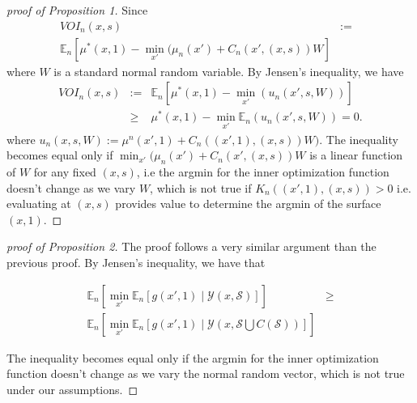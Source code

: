 \documentclass[letterpaper]{article}
\newcommand{\E}{\mathbb{E}}
\numberwithin{equation}{section}
\renewcommand{\S}{\mathcal{S}}
\newcommand{\Y}{\mathcal{Y}}
\begin{document}
\begin{proof}[proof of Proposition 1]
Since
\begin{eqnarray*}
VOI_{n}(x, s) &:=& \\
\E_n[\mu^*(x, 1) - \min_{x'} (\mu_n(x') + C_{n}(x', (x, s)) W]
\end{eqnarray*}
where $W$ is a standard normal random variable. By Jensen's inequality, we have
\begin{eqnarray*}
VOI_{n}(x, s) &:=& \E_n[\mu^*(x, 1) - \min_{x'} (u_{n}\left(x',s,W\right))]\\
&\ge& \mu^*(x, 1) - \min_{x'} \E_n(u_{n}\left(x',s,W\right)) = 0.
\end{eqnarray*}
where $u_{n}\left(x,s,W\right):=\mu^n(x', 1) + C_{n}((x', 1), (x, s)) W)$.
The inequality becomes equal only if $\min_{x'} (\mu_n(x') + C_{n}(x', (x, s)) W$ is a linear function of $W$ for any fixed $(x, s)$, i.e the argmin for the inner optimization function doesn't change as we vary $W$, which is not true if $K_{n}((x', 1), (x, s))>0$ i.e. evaluating at $(x, s)$ provides value to determine the argmin of the surface $(x, 1)$.
\end{proof}

\begin{proof}[proof of Proposition 2]
The proof follows a very similar argument than the previous proof. By Jensen's inequality, we have that

\begin{eqnarray*}
\E_{n}\left[\min_{x'}\E_{n}\left[g(x',1)\mid\Y(x,\S)\right]\right] & \geq\\
\E_{n}\left[\min_{x'}\E_{n}\left[g(x',1)\mid\Y(x,\S\bigcup C(\S))\right]\right]
\end{eqnarray*}

The inequality becomes equal only if the argmin for the inner optimization function doesn't change as we vary the normal random vector, which is not true under our assumptions.


\end{proof}
\end{document}
